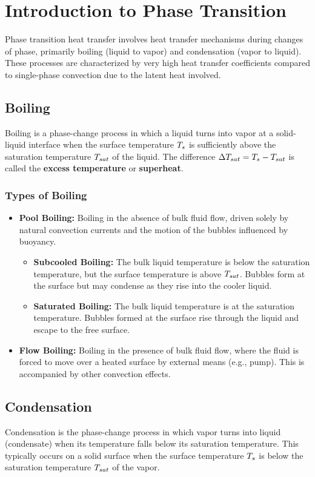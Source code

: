 \section{Introduction to Phase Transition}

Phase transition heat transfer involves heat transfer mechanisms during changes of phase, primarily boiling (liquid to vapor) and condensation (vapor to liquid). These processes are characterized by very high heat transfer coefficients compared to single-phase convection due to the latent heat involved.

\subsection{Boiling}
Boiling is a phase-change process in which a liquid turns into vapor at a solid-liquid interface when the surface temperature $T_s$ is sufficiently above the saturation temperature $T_{sat}$ of the liquid. The difference $\Delta T_{sat} = T_s - T_{sat}$ is called the \textbf{excess temperature} or \textbf{superheat}.

\subsubsection*{Types of Boiling}
\begin{itemize}
    \item \textbf{Pool Boiling:} Boiling in the absence of bulk fluid flow, driven solely by natural convection currents and the motion of the bubbles influenced by buoyancy.
        \begin{itemize}
            \item \textbf{Subcooled Boiling:} The bulk liquid temperature is below the saturation temperature, but the surface temperature is above $T_{sat}$. Bubbles form at the surface but may condense as they rise into the cooler liquid.
            \item \textbf{Saturated Boiling:} The bulk liquid temperature is at the saturation temperature. Bubbles formed at the surface rise through the liquid and escape to the free surface.
        \end{itemize}
    \item \textbf{Flow Boiling:} Boiling in the presence of bulk fluid flow, where the fluid is forced to move over a heated surface by external means (e.g., pump). This is accompanied by other convection effects.
\end{itemize}

\subsection{Condensation}
Condensation is the phase-change process in which vapor turns into liquid (condensate) when its temperature falls below its saturation temperature. This typically occurs on a solid surface when the surface temperature $T_s$ is below the saturation temperature $T_{sat}$ of the vapor.

